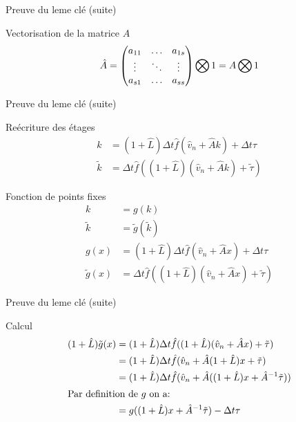 \begin{frame}{Preuve du leme clé (suite)}
  
 \begin{block}{Vectorisation de la matrice $A$}
  \begin{equation*}
\hat{A}=\begin{pmatrix}
    a_{11}	&\ldots	&a_{1s}\\
    \vdots	&\ddots	&\vdots\\
    a_{s1}	&\ldots	&a_{ss}\\
  \end{pmatrix} \bigotimes 1=A \bigotimes 1
\end{equation*}
 \end{block}

\end{frame}

\begin{frame}{Preuve du leme clé (suite)}
 \begin{block}{Reécriture des étages}
  \begin{align*}
k&=(1+\hat{L})\Delta t\hat{f}(\hat{v}_{n}+\hat{A}k)+\Delta t\tau\\
\tilde{k}&=\Delta t \hat{f}((1+\hat{L})(\hat{v}_{n}+\hat{A}k)+\tilde{\tau})
\end{align*}
 \end{block}
 
 \begin{block}{Fonction de points fixes}
  \begin{align*}
k&=g(k)\\
\tilde{k}&=\tilde{g}(\tilde{k})\\
g(x)&=(1+\hat{L})\Delta t \hat{f}(\hat{v}_{n}+\hat{A}x)+\Delta t\tau\\
\tilde{g}(x)&=\Delta t \hat{f}((1+\hat{L})(\hat{v}_{n}+\hat{A}x)+\tilde{\tau})
\end{align*}
 \end{block}

\end{frame}

\begin{frame}{Preuve du leme clé (suite)}
  \begin{block}{Calcul}
  \begin{align*}
(1+\hat{L})\tilde{g}(x)&=(1+\hat{L})\Delta t \hat{f}((1+\hat{L})(\hat{v}_{n}+\hat{A}x)+\tilde{\tau})\\
&=(1+\hat{L})\Delta t \hat{f}(\hat{v}_{n}+\hat{A} (1+\hat{L})x+\tilde{\tau})\\
&=(1+\hat{L})\Delta t \hat{f}(\hat{v}_{n}+\hat{A} ((1+\hat{L})x+\hat{A}^{-1}\tilde{\tau}))\\
\intertext{Par definition de $g$ on a:}
&=g((1+\hat{L})x+\hat{A}^{-1}\tilde{\tau})-\Delta t \tau
\end{align*}
 \end{block}
\end{frame}

